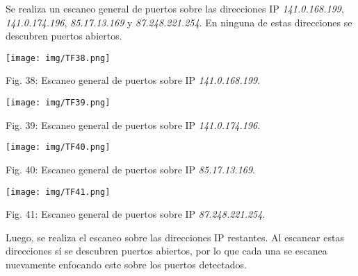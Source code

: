 \documentclass[12pt,oneside,a4paper]{book}
\begin{document}
\vspace{2em}

\hspace{20pt}
Se realiza un escaneo general de puertos sobre las direcciones IP \textit{141.0.168.199}, \textit{141.0.174.196}, \textit{85.17.13.169} y \textit{87.248.221.254}. En ninguna de estas direcciones se descubren puertos abiertos.

\vspace{2em}

\begin{center}
	\texttt{[image: img/TF38.png]}
    
\vspace{0.1em}
    
    Fig. 38: Escaneo general de puertos sobre IP \textit{141.0.168.199}.
\end{center}

\vspace{2em}

\begin{center}
	\texttt{[image: img/TF39.png]}
    
\vspace{0.1em}
    
    Fig. 39: Escaneo general de puertos sobre IP \textit{141.0.174.196}.
\end{center}

\vspace{2em}

\begin{center}
	\texttt{[image: img/TF40.png]}
    
\vspace{0.1em}
    
    Fig. 40: Escaneo general de puertos sobre IP \textit{85.17.13.169}.
\end{center}

\vspace{2em}

\begin{center}
	\texttt{[image: img/TF41.png]}
    
\vspace{0.1em}
    
    Fig. 41: Escaneo general de puertos sobre IP \textit{87.248.221.254}.
\end{center}

\vspace{2em}

\hspace{20pt}
Luego, se realiza el escaneo sobre las direcciones IP restantes. Al escanear estas direcciones sí se descubren puertos abiertos, por lo que cada una se escanea nuevamente enfocando este sobre los puertos detectados.
\end{document}
